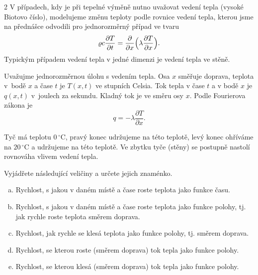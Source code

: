 \begin{multicols}2
V případech, kdy je při tepelné výměně nutno uvažovat vedení tepla (vysoké Biotovo číslo), modelujeme změnu teploty podle rovnice vedení tepla, kterou jsme na přednášce odvodili pro jednorozměrný případ ve tvaru
$$\varrho c \frac{\partial T}{\partial t}=\frac{\partial}{\partial x}\Bigl(\lambda\frac{\partial T}{\partial x}\Bigr).$$  Typickým případem vedení tepla v jedné dimenzi je vedení tepla ve stěně. 

Uvažujme jednorozměrnou úlohu s vedením tepla. Osa $x$ směřuje doprava, teplota v~bodě $x$ a čase $t$ je $T(x,t)$ ve stupních Celsia. Tok tepla v čase $t$ a v bodě $x$ je $q(x,t)$ v~joulech za sekundu. Kladný tok je ve směru osy $x$.
Podle Fourierova zákona je $$q=-\lambda \frac{\partial T}{\partial x}.$$

Tyč má teplotu $0\,^{\circ}\mathrm{C}$, pravý konec udržujeme na této teplotě, levý konec ohříváme na $20\,^{\circ}\mathrm{C}$ a udržujeme na této teplotě. Ve zbytku tyče (stěny) se postupně nastolí rovnováha vlivem vedení tepla.

\vspace*{-5pt}
Vyjádřete následující veličiny a určete jejich znaménko.

\vspace*{-15pt}
\begin{enumerate}[a)] pt
\item Rychlost, s jakou v daném místě a čase roste teplota jako funkce času.
\item Rychlost, s jakou v daném místě a čase roste teplota jako funkce polohy, tj. jak rychle  roste teplota směrem doprava.
\item Rychlost, jak rychle se klesá teplota jako funkce polohy, tj. směrem doprava.
\item Rychlost, se kterou roste (směrem doprava) tok tepla jako funkce polohy.
\item Rychlost, se kterou klesá (směrem doprava) tok tepla jako funkce polohy.
\end{enumerate}
\end{multicols}

